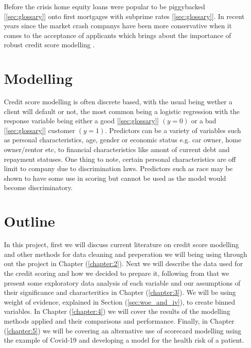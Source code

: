  Before the crisis home equity loans were popular to be piggybacked [\ref{sec:glossary}] onto first mortgages with subprime rates [\ref{sec:glossary}]. In recent years since the market crash companys have been more conservative when it comes to the acceptance of applicants which brings about the importance of robust credit score modelling \parencite{corelogic2016home}.

\section{Modelling}
Credit score modelling is often discrete based, with the usual being wether a client will default or not, the most common being a logistic regression with the response variable being either a good [\ref{sec:glossary}] $(y=0)$ or a bad [\ref{sec:glossary}] customer $(y=1)$. Predictors can be a variety of variables such as personal characteristics, age, gender or economic status e.g. car owner, home owner/rentor etc, to financial characteristics like amont of current debt and repayment statuses. One thing to note, certain personal characteristics are off limit to company due to discrimination laws. Predictors such as race may be shown to have some use in scoring but cannot be used as the model would become discriminatory.\\

\section{Outline}
In this project, first we will discuss current literature on credit score modelling and other methods for data cleaning and preperation we will being using through out the project in Chapter (\ref{chapter:2}). Next we will describe the data used for the credit scoring and how we decided to prepare it, following from that we present some exploratory data analysis of each variable and our assumptions of their significance and characteritics in Chapter (\ref{chapter:3}). We will be using weight of evidence, explained in Section (\ref{sec:woe_and_iv}), to create binned variables. In Chapter (\ref{chapter:4}) we will cover the results of the modelling methods applied and their comparisons and performance. Finally, in Chapter (\ref{chapter:5}) we will be covering an alternative use of scorecard modelling using the example of Covid-19 and developing a model for the health risk of a patient.